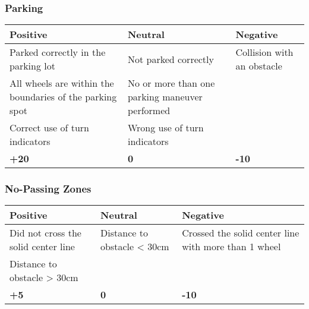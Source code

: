 {\begin{highlight}
		\subsubsection*{Parking}
		\begin{table}[H]
			\begin{tabularx}{\textwidth}{XXX}
				\toprule
				\textbf{Positive}                                        & \textbf{Neutral}                               & \textbf{Negative}          \\
				\midrule
				Parked correctly in the parking lot                      & Not parked correctly                           & Collision with an obstacle \\
				All wheels are within the boundaries of the parking spot & No or more than one parking maneuver performed &                            \\
				Correct use of turn indicators                           & Wrong use of turn indicators                   &                            \\
				\topstrut
				\textbf{+20}                                             & \textbf{0}                                     & \textbf{-10}               \\
				\bottomrule
			\end{tabularx}
		\end{table}

		\subsubsection*{No-Passing Zones}
		\begin{table}[H]
			\begin{tabularx}{\textwidth}{XXX}
				\toprule
				\textbf{Positive}                   & \textbf{Neutral}            & \textbf{Negative}                                    \\
				\midrule
				Did not cross the solid center line & Distance to obstacle < 30cm & Crossed the solid center line with more than 1 wheel \\
				Distance to obstacle > 30cm         &                             &                                                      \\
				\topstrut
				\textbf{+5}                         & \textbf{0}                  & \textbf{-10}                                         \\
				\bottomrule
			\end{tabularx}
		\end{table}


\end{highlight}}
